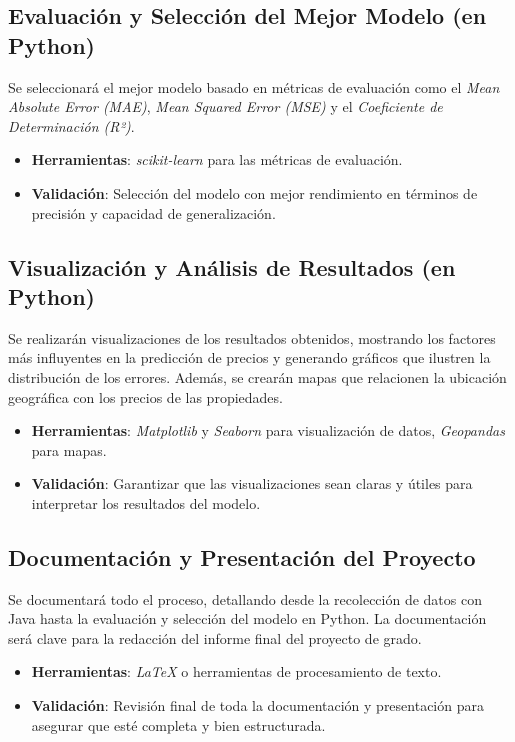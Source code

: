\subsection*{Evaluación y Selección del Mejor Modelo (en Python)}
Se seleccionará el mejor modelo basado en métricas de evaluación como el \textit{Mean Absolute Error (MAE)}, \textit{Mean Squared Error (MSE)} y el \textit{Coeficiente de Determinación (R²)}.

\begin{itemize}
    \item \textbf{Herramientas}: \textit{scikit-learn} para las métricas de evaluación.
    \item \textbf{Validación}: Selección del modelo con mejor rendimiento en términos de precisión y capacidad de generalización.
\end{itemize}

\subsection*{Visualización y Análisis de Resultados (en Python)}
Se realizarán visualizaciones de los resultados obtenidos, mostrando los factores más influyentes en la predicción de precios y generando gráficos que ilustren la distribución de los errores. Además, se crearán mapas que relacionen la ubicación geográfica con los precios de las propiedades.

\begin{itemize}
    \item \textbf{Herramientas}: \textit{Matplotlib} y \textit{Seaborn} para visualización de datos, \textit{Geopandas} para mapas.
    \item \textbf{Validación}: Garantizar que las visualizaciones sean claras y útiles para interpretar los resultados del modelo.
\end{itemize}

\subsection*{Documentación y Presentación del Proyecto}
Se documentará todo el proceso, detallando desde la recolección de datos con Java hasta la evaluación y selección del modelo en Python. La documentación será clave para la redacción del informe final del proyecto de grado.

\begin{itemize}
    \item \textbf{Herramientas}: \textit{LaTeX} o herramientas de procesamiento de texto.
    \item \textbf{Validación}: Revisión final de toda la documentación y presentación para asegurar que esté completa y bien estructurada.
\end{itemize}
